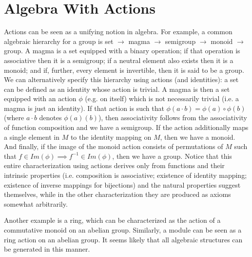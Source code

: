 \documentclass[pra,twocolumn,groupedaddress,10pt]{revtex4}
\theoremstyle{definition}
\begin{document}



\appendix

\section{Algebra With Actions} \label{app:algact}

Actions can be seen as a unifying notion in algebra. For example, a common algebraic hierarchy for a group is \textsf{set} $\rightarrow$ \textsf{magma} $\rightarrow$ \textsf{semigroup} $\rightarrow$ \textsf{monoid} $\rightarrow$ \textsf{group}. A magma is a set equipped with a binary operation; if that operation is associative then it is a semigroup; if a neutral element also exists then it is a monoid; and if, further, every element is invertible, then it is said to be a group. We can alternatively specify this hierarchy using actions (and identities): a set can be defined as an identity whose action is trivial. A magma is then a set equipped with an action $\phi$ (e.g. on itself) which is not necessarily trivial (i.e. a magma is just an identity). If that action is such that $\phi(a \cdot b) = \phi(a) \circ \phi(b)$ (where $a \cdot b$ denotes $\phi(a)(b)$), then associativity follows from the associativity of function composition and we have a semigroup. If the action additionally maps a single element in $M$ to the identity mapping on $M$, then we have a monoid. And finally, if the image of the monoid action consists of permutations of $M$ such that $f \in Im(\phi) \implies f^{-1} \in Im(\phi)$, then we have a group. Notice that this entire characterization using actions derives only from functions and their intrinsic properties (i.e. composition is associative; existence of identity mapping; existence of inverse mappings for bijections) and the natural properties suggest themselves, while in the other characterization they are produced as axioms somewhat arbitrarily.

Another example is a ring, which can be characterized as the action of a commutative monoid on an abelian group. Similarly, a module can be seen as a ring action on an abelian group. It seems likely that all algebraic structures can be generated in this manner.
\end{document}
